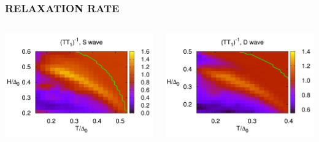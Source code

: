 \documentclass[amssymb,amsmath]{beamer}
\begin{document}
\begin{frame} \frametitle{RELAXATION RATE}

\begin{columns}
\begin{column}{0.5\textwidth}
\includegraphics[scale=0.17]{./figures_3/fig3_S/Fig3.png}
\end{column}
\begin{column}{0.5\textwidth}
\includegraphics[scale=0.17]{./figures_3/fig3_D/Fig3.png}

\end{column}
\end{columns}
\end{frame}
\end{document}
